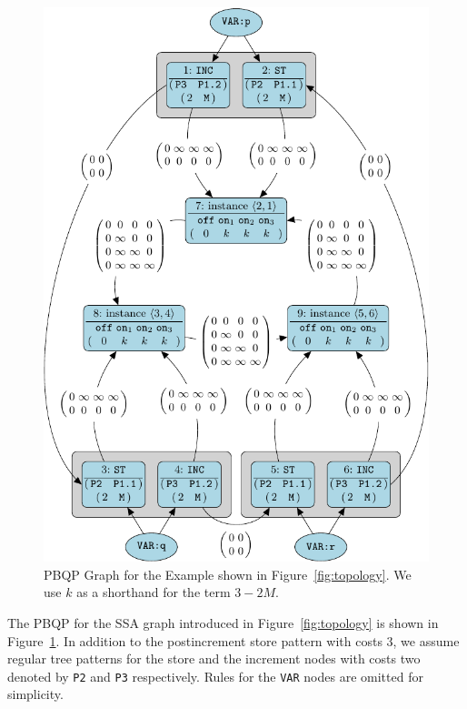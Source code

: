 \begin{figure}


    \includegraphics{pgf-fig009}
  \caption{PBQP Graph for the Example shown in
    Figure~\ref{fig:topology}. We use $k$ as a shorthand for the term
    $3-2M$.}\label{fig:pbqpinst}
\end{figure}

The PBQP for the SSA graph introduced in Figure~\ref{fig:topology} is
shown in Figure~\ref{fig:pbqpinst}. In addition to the postincrement
store pattern with costs 3, we assume regular tree patterns for the
store and the increment nodes with costs two denoted by \texttt{P2}
and \texttt{P3} respectively. Rules for the \texttt{VAR} nodes are
omitted for simplicity.

